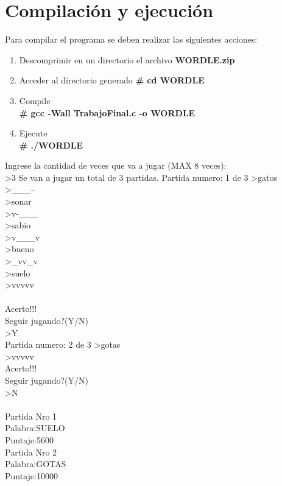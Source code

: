 \documentclass[oneside]{article}
\begin{document}
	\newpage
	\thispagestyle{fancy}
	
	\section*{Compilación y ejecución}
	Para compilar el programa se deben realizar las siguientes acciones:
		\begin{enumerate}
		\item Descomprimir en un directorio el archivo \textbf{WORDLE.zip}
		\item Acceder al directorio generado \textbf{\# cd WORDLE}
		\item Compile\\ \textbf{\# gcc -Wall TrabajoFinal.c -o WORDLE}
		\item Ejecute\\ \textbf{\# ./WORDLE}		
		\end{enumerate}
	Ingrese la cantidad de veces que va a jugar (MAX 8 veces):\\
	\textgreater3
	Se van a jugar un total de 3 partidas.
	Partida numero: 1 de 3 
	\textgreater gatos\\
	\textgreater \_\_\_--\\
	\textgreater sonar\\
	\textgreater v-\_\_\_\\
	\textgreater sabio\\
	\textgreater v\_\_\_v\\
	\textgreater bueno\\
	\textgreater \_vv\_v\\
	\textgreater suelo\\
	\textgreater vvvvv\\	
	\\Acerto!!!\\
	Seguir jugando?(Y/N)\\ 
	\textgreater Y\\
	Partida numero: 2 de 3 
	\textgreater gotas\\
	\textgreater vvvvv\\	
	Acerto!!!\\
	Seguir jugando?(Y/N)\\
	\textgreater N\\ \\
	Partida Nro 1\\
	Palabra:SUELO\\
	Puntaje:5600\\

	Partida Nro 2\\
	Palabra:GOTAS\\
	Puntaje:10000\\
\end{document}
